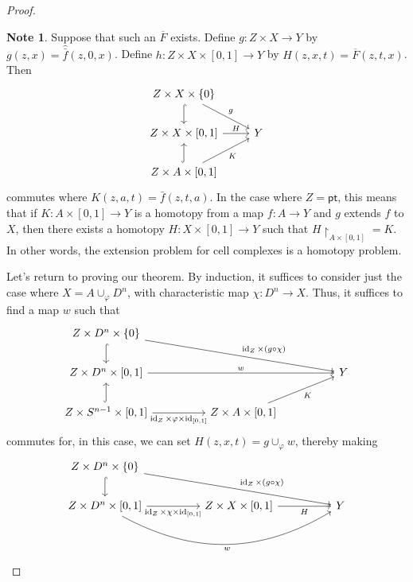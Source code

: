 \documentclass[10pt,letterpaper,cm]{nupset}
\theoremstyle{definition}
\newtheorem{note}[defn]{Note}
\theoremstyle{theorem}
\theoremstyle{remark}
\newcommand{\1}{\mathbb{1}}
\newcommand{\0}{\vec 0}
\newcommand{\pt}{\mathsf{pt}}
\DeclareMathOperator{\id}{id}
\begin{document}
\begin{proof}
\begin{note}
Suppose that such an $\overline{F}$ exists. Define $g: Z \times X \to Y$ by $g(z,x) = \hat{\bar{f}}(z,0, x)$. Define $h: Z \times X \times \left[0,1\right] \to Y$ by $H(z,x,t) = \overline{F}(z,t,x)$. Then
\[
\begin{tikzcd}
Z\times X\times \left\{0\right\} \arrow[rd, "g"] \arrow[d, hook]     &   \\
{Z\times X \times \left[0,1\right]} \arrow[r, "H"]                   & Y \\
{Z\times A \times \left[0,1\right]} \arrow[u, hook] \arrow[ru, "K"'] &  
\end{tikzcd}
\]
commutes where $K(z,a,t) = \bar{f}(z,t,a)$. In the case where $Z = \pt$, this means that if $K: A \times \left[0,1\right] \to Y$ is a homotopy from a map $f: A \to Y$ and $g$ extends $f$ to $X$, then there exists a homotopy $H : X \times \left[0,1\right]\to Y$ such that $H\restriction_{A \times \left[0,1\right]} = K$. In other words, the extension problem for cell complexes is a homotopy problem. 
\end{note}
Let's return to proving our theorem. By induction, it suffices to consider just the case where $X = A \cup_{\varphi} D^n$, with characteristic map $\chi: D^n \to X$.   Thus, it suffices to find a map $w$ such that
\[
\begin{tikzcd}[column sep = huge]
Z\times D^n \times \left\{0\right\} \arrow[d, hook] \arrow[rrd, "\id_Z \times (g \circ \chi)"]                    &                                          &   \\
{Z\times D^n \times \left[0,1\right]} \arrow[rr, "w"]                                                                  &                                          & Y \\
{Z\times S^{n-1} \times \left[0,1\right]} \arrow[u, hook] \arrow[r, "{\id_Z \times \varphi \times \id_{\left[0,1\right]}}"'] & {Z\times A\times \left[0,1\right]} \arrow[ru, "K"'] &  
\end{tikzcd}
\] commutes for, in this case, we can set $H(z, x, t) = g \cup_{\varphi} w$, thereby making
\[
\begin{tikzcd}[column sep = huge]
Z\times D^n \times \left\{0\right\} \arrow[d, hook] \arrow[rrd, "\id_Z \times (g \circ \chi)"]                          &                                           &   \\
{Z\times D^n \times \left[0,1\right]} \arrow[r, "{\id_Z \times \chi \times \id_{\left[0,1\right]}}"'] \arrow[rr, "w"', bend right] & {Z\times X\times \left[0,1\right]} \arrow[r, "H"']   & Y \\

\end{tikzcd}\]
\end{proof}
\end{document}
